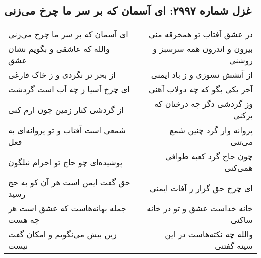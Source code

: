 \begin{center}
\section*{غزل شماره ۲۹۹۷: ای آسمان که بر سر ما چرخ می‌زنی}
\label{sec:2997}
\begin{longtable}{l p{0.5cm} r}
ای آسمان که بر سر ما چرخ می‌زنی
&&
در عشق آفتاب تو همخرقه منی
\\
والله که عاشقی و بگویم نشان عشق
&&
بیرون و اندرون همه سرسبز و روشنی
\\
از بحر تر نگردی و ز خاک فارغی
&&
از آتشش نسوزی و ز باد ایمنی
\\
ای چرخ آسیا ز چه آب است گردشت
&&
آخر یکی بگو که چه دولاب آهنی
\\
از گردشی کنار زمین چون ارم کنی
&&
وز گردشی دگر چه درختان که برکنی
\\
شمعی است آفتاب و تو پروانه‌ای به فعل
&&
پروانه وار گرد چنین شمع می‌تنی
\\
پوشیده‌ای چو حاج تو احرام نیلگون
&&
چون حاج گرد کعبه طوافی همی‌کنی
\\
حق گفت ایمن است هر آن کو به حج رسید
&&
ای چرخ حق گزار ز آفات ایمنی
\\
جمله بهانه‌هاست که عشق است هر چه هست
&&
خانه خداست عشق و تو در خانه ساکنی
\\
زین بیش می‌نگویم و امکان گفت نیست
&&
والله چه نکته‌هاست در این سینه گفتنی
\\
\end{longtable}
\end{center}
